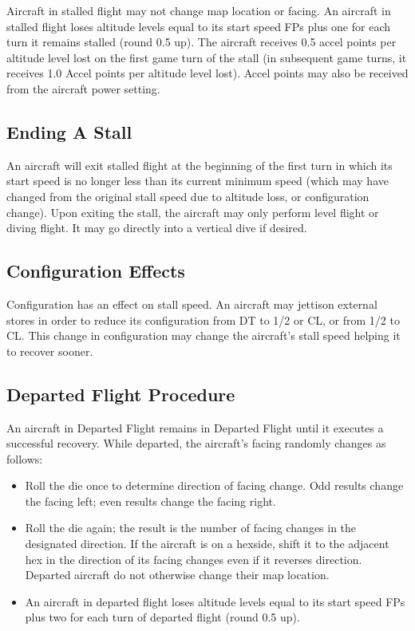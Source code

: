 Aircraft in stalled flight may not change map location or facing. An aircraft in stalled flight loses altitude levels equal to its start speed FPs plus one for each turn it remains stalled (round 0.5 up). The aircraft receives 0.5 accel points per altitude level lost on the first game turn of the stall (in subsequent game turns, it receives 1.0 Accel points per altitude level lost). Accel points may also be received from the aircraft power setting.

\subsection{Ending A Stall}
An aircraft will exit stalled flight at the beginning of the first turn in which its start speed is no longer less than its current minimum speed (which may have changed from the original stall speed due to altitude loss, or configuration change). Upon exiting the stall, the aircraft may only perform level flight or diving flight. It may go directly into a vertical dive if desired.  

\subsection{Configuration Effects}
Configuration has an effect on stall speed. An aircraft may jettison external stores in order to reduce its configuration from DT to 1/2 or CL, or from 1/2 to CL. This change in configuration may change the aircraft's stall speed helping it to recover sooner.

\subsection{Departed Flight Procedure}
An aircraft in Departed Flight remains in Departed Flight until it executes a successful recovery. While departed, the aircraft's facing randomly changes as follows:

\begin{itemize}

    \item Roll the die once to determine direction of facing change. Odd results change the facing left; even results change the facing right.

    \item Roll the die again; the result is the number of facing changes in the designated direction. If the aircraft is on a hexside, shift it to the adjacent hex in the direction of its facing changes even if it reverses direction. Departed aircraft do not otherwise change their map location.

    \item An aircraft in departed flight loses altitude levels equal to its start speed FPs plus two for each turn of departed flight (round 0.5 up).

\end{itemize}

